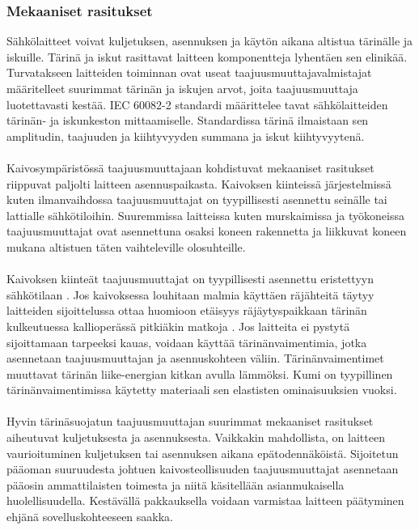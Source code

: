 \documentclass[finnish,12pt,a4paper,pdftex,elec,utf8]{aaltothesis}
\begin{document}
\subsubsection{Mekaaniset rasitukset}
Sähkölaitteet voivat kuljetuksen, asennuksen ja käytön aikana altistua tärinälle ja iskuille. Tärinä ja iskut rasittavat laitteen komponentteja lyhentäen sen elinikää. Turvatakseen laitteiden toiminnan ovat useat taajuusmuuttajavalmistajat määritelleet suurimmat tärinän ja iskujen arvot, joita taajuusmuuttaja luotettavasti kestää. IEC 60082-2 standardi määrittelee tavat sähkölaitteiden tärinän- ja iskunkeston mittaamiselle. Standardissa tärinä ilmaistaan sen amplitudin, taajuuden ja kiihtyvyyden summana ja iskut kiihtyvyytenä. \cite{IEC60082-2}
\\\\
Kaivosympäristössä taajuusmuuttajaan kohdistuvat mekaaniset rasitukset riippuvat paljolti laitteen asennuspaikasta. Kaivoksen kiinteissä järjestelmissä kuten ilmanvaihdossa taajuusmuuttajat on tyypillisesti asennettu seinälle tai lattialle sähkötiloihin. Suuremmissa laitteissa kuten murskaimissa ja työkoneissa taajuusmuuttajat ovat asennettuna osaksi koneen rakennetta ja liikkuvat koneen mukana altistuen täten vaihteleville olosuhteille.
\\\\
Kaivoksen kiinteät taajuusmuuttajat on tyypillisesti asennettu eristettyyn sähkötilaan \cite{MyyntiHaastattelu}. Jos kaivoksessa louhitaan malmia käyttäen räjähteitä täytyy laitteiden sijoittelussa ottaa huomioon etäisyys räjäytyspaikkaan tärinän kulkeutuessa kallioperässä pitkiäkin matkoja . Jos laitteita ei pystytä sijoittamaan tarpeeksi kauas, voidaan käyttää tärinänvaimentimia, jotka asennetaan taajuusmuuttajan ja asennuskohteen väliin. Tärinänvaimentimet muuttavat tärinän liike-energian kitkan avulla lämmöksi. Kumi on tyypillinen tärinänvaimentimissa käytetty materiaali sen elastisten ominaisuuksien vuoksi.
\\\\
Hyvin tärinäsuojatun taajuusmuuttajan suurimmat mekaaniset rasitukset aiheutuvat kuljetuksesta ja asennuksesta. Vaikkakin mahdollista, on laitteen vaurioituminen kuljetuksen tai asennuksen aikana epätodennäköistä. Sijoitetun pääoman suuruudesta johtuen kaivosteollisuuden taajuusmuuttajat asennetaan pääosin ammattilaisten toimesta ja niitä käsitellään asianmukaisella huolellisuudella. Kestävällä pakkauksella voidaan varmistaa laitteen päätyminen ehjänä sovelluskohteeseen saakka.
\\\\ 
\end{document}
